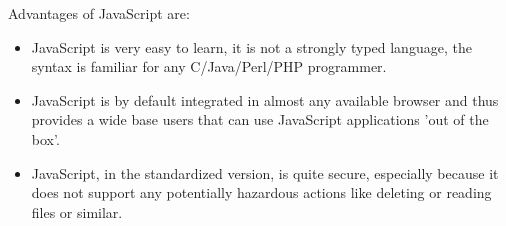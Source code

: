 Advantages of JavaScript are:
\begin{itemize}
	\item JavaScript is very easy to learn, it is not a strongly typed language, the syntax is familiar for any C/Java/Perl/PHP programmer.
	\item JavaScript is by default integrated in almost any available browser and thus provides a wide base users that can use JavaScript applications 'out of the box'.
	\item JavaScript, in the standardized version, is quite secure, especially because it does not support any potentially hazardous actions like deleting or reading files or similar.
\end{itemize}